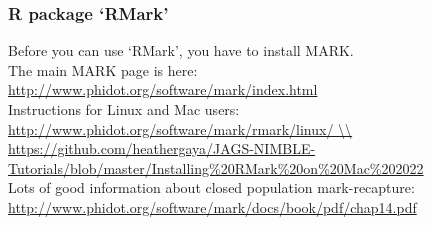 \documentclass[color=usenames,dvipsnames]{beamer}\usepackage[]{graphicx}\usepackage[]{xcolor}
\begin{document}














\begin{frame}
  \frametitle{R package `RMark'}
  Before you can use `RMark', you have to install MARK.  \\
  \vfill
  The main MARK page is here: \\
  {\color{blue} \url{ 
    http://www.phidot.org/software/mark/index.html
  }}  \\
  \vfill
  Instructions for Linux and Mac users: \\
  {\color{blue}
    \url{
      http://www.phidot.org/software/mark/rmark/linux/ \\
    }
    \vspace{6pt}
    \url{
      https://github.com/heathergaya/JAGS-NIMBLE-Tutorials/blob/master/Installing\%20RMark\%20on\%20Mac\%202022
    } } \\
  \vfill
  Lots of good information about closed population mark-recapture: \\
  {\color{blue} \footnotesize \url{ 
    http://www.phidot.org/software/mark/docs/book/pdf/chap14.pdf
  }}
\end{frame}
\end{document}
